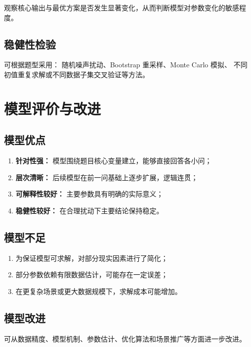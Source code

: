 \documentclass[UTF8,fontset=none,a4paper,12pt]{ctexart}
\begin{document}
观察核心输出与最优方案是否发生显著变化，从而判断模型对参数变化的敏感程度。

\subsection{稳健性检验}

可根据题型采用：
随机噪声扰动、Bootstrap 重采样、Monte Carlo 模拟、
不同初值重复求解或不同数据子集交叉验证等方法。

\section{模型评价与改进}

\subsection{模型优点}

\begin{enumerate}
  \item \textbf{针对性强：} 模型围绕题目核心变量建立，能够直接回答各小问；
  \item \textbf{层次清晰：} 后续模型在前一问基础上逐步扩展，逻辑连贯；
  \item \textbf{可解释性较好：} 主要参数具有明确的实际意义；
  \item \textbf{稳健性较好：} 在合理扰动下主要结论保持稳定。
\end{enumerate}

\subsection{模型不足}

\begin{enumerate}
  \item 为保证模型可求解，对部分现实因素进行了简化；
  \item 部分参数依赖有限数据估计，可能存在一定误差；
  \item 在更复杂场景或更大数据规模下，求解成本可能增加。
\end{enumerate}

\subsection{模型改进}

可从数据精度、模型机制、参数估计、优化算法和场景推广等方面进一步改进。
\end{document}
